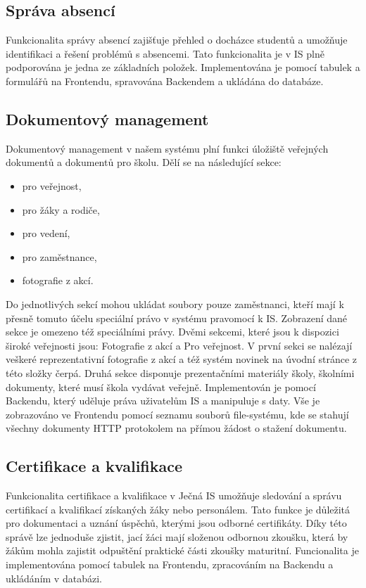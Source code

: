 \documentclass[FM,Proj]{tulthesis}
\begin{document}
\subsection*{Správa absencí}
Funkcionalita správy absencí zajišťuje přehled o docházce studentů a umožňuje identifikaci
a řešení problémů s absencemi. Tato funkcionalita je v IS plně podporována je jedna ze 
základních položek. Implementována je pomocí tabulek a formulářů na Frontendu, spravována 
Backendem a ukládána do databáze.

\subsection*{Dokumentový management}
Dokumentový management v našem systému plní funkci úložiště veřejných dokumentů
a dokumentů pro školu. Dělí se na následující sekce:
\begin{itemize}
    \item pro veřejnost,
    \item pro žáky a rodiče,
    \item pro vedení,
    \item pro zaměstnance,
    \item fotografie z akcí.
\end{itemize}
Do jednotlivých sekcí mohou ukládat soubory pouze zaměstnanci, kteří mají k
přesně tomuto účelu speciální právo v systému pravomocí k IS. Zobrazení dané 
sekce je omezeno též speciálními právy. Dvěmi sekcemi, které jsou k dispozici
široké veřejnosti jsou: Fotografie z akcí a Pro veřejnost. V první sekci se
nalézají veškeré reprezentativní fotografie z akcí a též systém novinek na 
úvodní stránce z této složky čerpá. Druhá sekce disponuje prezentačními materiály
školy, školními dokumenty, které musí škola vydávat veřejně.
Implementován je pomocí Backendu, který uděluje práva uživatelům IS a manipuluje 
s daty. Vše je zobrazováno ve Frontendu pomocí seznamu souborů file-systému, kde
se stahují všechny dokumenty HTTP protokolem na přímou žádost o stažení dokumentu.

\subsection*{Certifikace a kvalifikace}
Funkcionalita certifikace a kvalifikace v Ječná IS umožňuje sledování a správu 
certifikací a kvalifikací získaných žáky nebo personálem. Tato funkce je důležitá
pro dokumentaci a uznání úspěchů, kterými jsou odborné certifikáty. Díky této 
správě lze jednoduše zjistit, jací žáci mají složenou odbornou zkoušku, 
která by žákům mohla zajistit odpuštění praktické části zkoušky maturitní.
Funcionalita je implementována pomocí tabulek na Frontendu, zpracováním na Backendu
a ukládáním v databázi.
\end{document}
